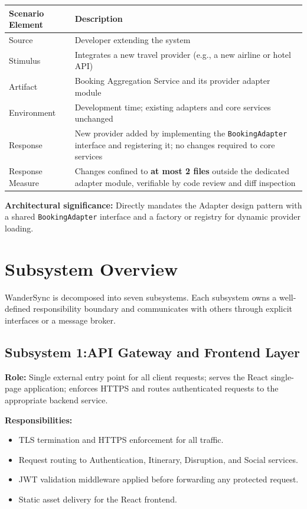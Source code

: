 \documentclass[12pt,a4paper]{article}
\begin{document}
\begin{tabularx}{\textwidth}{L{3.5cm}X}
\toprule
\textbf{Scenario Element} & \textbf{Description} \\
\midrule
Source            & Developer extending the system \\
Stimulus          & Integrates a new travel provider (e.g., a new airline or hotel API) \\
Artifact          & Booking Aggregation Service and its provider adapter module \\
Environment       & Development time; existing adapters and core services unchanged \\
Response          & New provider added by implementing the \texttt{BookingAdapter} interface and
                    registering it; no changes required to core services \\
Response Measure  & Changes confined to \textbf{at most 2 files} outside the dedicated adapter
                    module, verifiable by code review and diff inspection \\
\bottomrule
\end{tabularx}

\textbf{Architectural significance:} Directly mandates the Adapter design pattern with a shared
\texttt{BookingAdapter} interface and a factory or registry for dynamic provider loading.

\section{Subsystem Overview}

WanderSync is decomposed into seven subsystems. Each subsystem owns a well-defined responsibility
boundary and communicates with others through explicit interfaces or a message broker.

\subsection{Subsystem 1:API Gateway and Frontend Layer}

\textbf{Role:} Single external entry point for all client requests; serves the React single-page
application; enforces HTTPS and routes authenticated requests to the appropriate backend service.

\textbf{Responsibilities:}
\begin{itemize}[noitemsep]
  \item TLS termination and HTTPS enforcement for all traffic.
  \item Request routing to Authentication, Itinerary, Disruption, and Social services.
  \item JWT validation middleware applied before forwarding any protected request.
  \item Static asset delivery for the React frontend.
\end{itemize}
\end{document}
